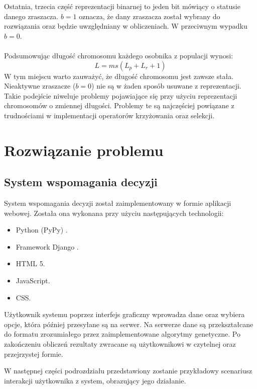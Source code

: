 \documentclass[twoside]{iisthesis}
\begin{document}
Ostatnia, trzecia część reprezentacji binarnej to jeden bit mówiący o statusie danego zraszacza. $b = 1$ oznacza, że dany zraszacza został wybrany do rozwiązania oraz będzie uwzględniany w obliczeniach. W przeciwnym wypadku $b = 0$.\\\\
Podsumowując długość chromosomu każdego osobnika z populacji wynosi:
\begin{equation}
	L = ms(L_{p} + L_{r} + 1)
\end{equation}
W tym miejscu warto zauważyć, że długość chromosomu jest zawsze stała. Nieaktywne zraszacze ($b=0$) nie są w żaden sposób usuwane z reprezentacji. Takie podejście niweluje problemy pojawiające się przy użyciu reprezentacji chromosomów o zmiennej długości. Problemy te są najczęściej powiązane z trudnościami w implementacji operatorów krzyżowania oraz selekcji.
\chapter{Rozwiązanie problemu}
\section{System wspomagania decyzji}
System wspomagania decyzji został zaimplementowany w formie aplikacji webowej. Została ona wykonana przy użyciu następujących technologii:\\
\begin{itemize}
	\item Python (PyPy) \cite{pypy}.
	\item Framework Django \cite{django}.
	\item HTML 5.
	\item JavaScript.
	\item CSS.\\
\end{itemize} 
Użytkownik systemu poprzez interfejs graficzny wprowadza dane oraz wybiera opcje, która później przesyłane są na serwer. Na serwerze dane są przekształcane do formatu zrozumiałego przez zaimplementowane algorytmy genetyczne. Po zakończeniu obliczeń rezultaty zwracane są użytkownikowi w czytelnej oraz przejrzystej formie.

W następnej części podrozdziału przedstawiony zostanie przykładowy scenariusz interakcji użytkownika z system, obrazujący jego działanie.
\end{document}
